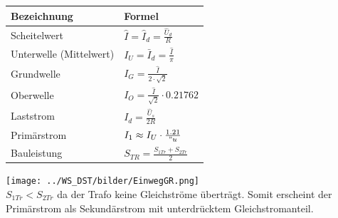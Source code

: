 	\begin{minipage}[c]{10cm}  
		\begin{tabular}{| l | l |}
    		\hline 
      		\textbf{Bezeichnung}
      		& \textbf{Formel} \\
      		\hline
      		Scheitelwert 
      		& $\hat{I} = \hat{I}_d = \frac{\hat{U}_d}{R} $ \\
      		Unterwelle (Mittelwert)
      		& $I_U = \bar{I}_d = \frac{\hat{I}}{\pi}$ \\
      		Grundwelle
      		& $I_G = \frac{\hat{I}}{2 \cdot \sqrt{2}}$ \\
      		Oberwelle
      		& $I_O = \frac{\hat{I}}{\sqrt{2}} \cdot 0.21762$ \\
      		Laststrom
      		& $I_{d} =\frac{\hat{U}_s}{2 R}$ \\
      		Prim\"arstrom
      		& $I_1 \approx I_U \cdot \frac{1.21}{"u}$ \\
      		Bauleistung 
      		& $S_{TR} = \frac{S_{1Tr} + S_{2Tr}}{2}$ \\
      		\hline 
    	\end{tabular}
	\end{minipage}   
	\begin{minipage}[c]{8cm}  
			\texttt{[image: ../WS\_DST/bilder/EinwegGR.png]}  \\			
	$S_{1Tr} < S_{2Tr}$ da der Trafo keine Gleichstr\"ome übertr\"agt. Somit erscheint der Prim\"arstrom
	als Sekund\"arstrom mit unterdrücktem Gleichstromanteil.			
	\end{minipage}

\newpage


